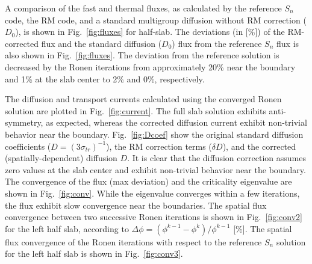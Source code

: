 
A comparison of the fast and thermal fluxes, as calculated by the reference $S_n$ code, the RM code, and a standard multigroup diffusion without RM correction ($D_0$), is shown in Fig.~\ref{fig:fluxes} for half-slab. The deviations (in [\%]) of the RM-corrected flux and the standard diffusion ($D_0$) flux from the reference $S_n$ flux is also shown in Fig.~\ref{fig:fluxes}. The deviation from the reference solution is decreased by the Ronen iterations from approximately 20\% near the boundary and 1\% at the slab center to 2\% and 0\%, respectively. 

The diffusion and transport currents calculated using the converged Ronen solution are plotted in Fig.~\ref{fig:current}. The full slab solution exhibits anti-symmetry, as expected, whereas the corrected diffusion current exhibit non-trivial behavior near the boundary. Fig.~\ref{fig:Dcoef} show the original standard diffusion coefficients ($D=(3\sigma_{tr})^{-1}$), the RM correction terms ($\delta D$), and the corrected (spatially-dependent) diffusion $D$. It is clear that the diffusion correction assumes zero values at the slab center and exhibit non-trivial behavior near the boundary. The convergence of the flux (max deviation) and the criticality eigenvalue are shown in Fig.~\ref{fig:conv}. While the eigenvalue converges within a few iterations, the flux exhibit slow convergence near the boundaries. The spatial flux convergence between two successive Ronen iterations is shown in Fig.~\ref{fig:conv2} for the left half slab, according to $\Delta\phi = (\phi^{k-1}-\phi^k)/\phi^{k-1}$ [\%]. The spatial flux convergence of the Ronen iterations with respect to the reference $S_n$ solution for the left half slab is shown in Fig.~\ref{fig:conv3}.

